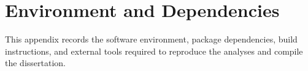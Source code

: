 \section{Environment and Dependencies}

This appendix records the software environment, package dependencies, build
instructions, and external tools required to reproduce the analyses and compile
the dissertation.
